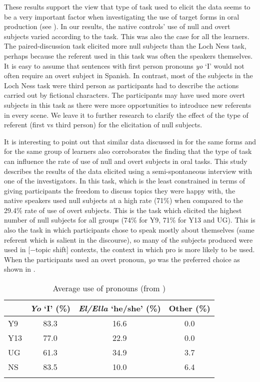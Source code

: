 \documentclass[output=paper]{langscibook}
\begin{document}
These results support the view that type of task used to elicit the data seems to be a very important factor when investigating the use of target forms in oral production (see \citealt{Tracy-VenturaMyles2015,Dominguez2019}). In our results, the native controls’ use of null and overt subjects varied according to the task. This was also the case for all the learners. The paired-discussion task elicited more null subjects than the Loch Ness task, perhaps because the referent used in this task was often the speakers themselves. It is easy to assume that sentences with first person pronouns \textit{yo} `I' would not often require an overt subject in Spanish. In contrast, most of the subjects in the Loch Ness task were third person as participants had to describe the actions carried out by fictional characters. The participants may have used more overt subjects in this task as there were more opportunities to introduce new referents in every scene. We leave it to further research to clarify the effect of the type of referent (first vs third person) for the elicitation of null subjects.

It is interesting to point out that similar data discussed in \citet{Dominguez2013} for the same forms and for the same group of learners also corroborates the finding that the type of task can influence the rate of use of null and overt subjects in oral tasks. This study describes the results of the data elicited using a semi-spontaneous interview with one of the investigators. In this task, which is the least constrained in terms of giving participants the freedom to discuss topics they were happy with, the native speakers used null subjects at a high rate (71\%) when compared to the 29.4\% rate of use of overt subjects. This is the task which elicited the highest number of null subjects for all groups (74\% for Y9, 71\% for Y13 and UG). This is also the task in which participants chose to speak mostly about themselves (same referent which is salient in the discourse), so many of the subjects produced were used in [−topic shift] contexts, the context in which pro is more likely to be used. When the participants used an overt pronoun, \textit{yo} was the preferred choice as shown in .

\begin{table}
\caption{Average use of pronouns (from \citealt{Dominguez2013})\label{tab:dominguez:12}}
\begin{tabular}{lccc}
\lsptoprule
& \textit{Yo} `I' (\%) & \textit{El/Ella} `he/she' (\%) & Other (\%)\\\midrule
Y9 & 83.3 & 16.6 & 0.0\\
Y13 & 77.0 & 22.9 & 0.0\\
UG & 61.3 & 34.9 & 3.7\\
NS & 83.5 & 10.0 & 6.4\\
\lspbottomrule
\end{tabular}
\end{table}
\end{document}
